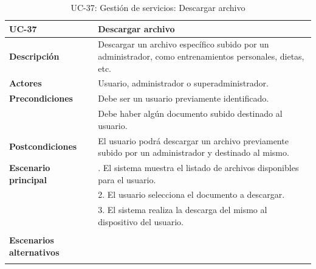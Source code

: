 \begin{table}[H]
  \begin{center}
    \begin{tabularx}{16.4cm}{|l|X|}
      \hline
      \textbf{UC-37} & \textbf{Descargar archivo}\\
      \hline
      \textbf{Descripción} & Descargar un archivo específico subido por un administrador, como entrenamientos personales, dietas, etc. \\
      \hline
      \textbf{Actores} & Usuario, administrador o superadministrador.\\
      \hline
      \textbf{Precondiciones} & Debe ser un usuario previamente identificado.\\
      & Debe haber algún documento subido destinado al usuario.\\
      \hline
      \textbf{Postcondiciones} & El usuario podrá descargar un archivo previamente subido por un administrador y destinado al mismo.\\
      \hline
      \textbf{Escenario principal} & \smallskip 1. El sistema muestra el listado de archivos disponibles para el usuario.\\
      & 2. El usuario selecciona el documento a descargar.\\
      & 3. El sistema realiza la descarga del mismo al dispositivo del usuario.\\
      & \\
      \hline
      \textbf{Escenarios alternativos} & \\
      & \\
      \hline
    \end{tabularx}
    \caption{UC-37: Gestión de servicios: Descargar archivo}
    \label{tab:CU-descargar-archivo}
  \end{center}
\end{table}


